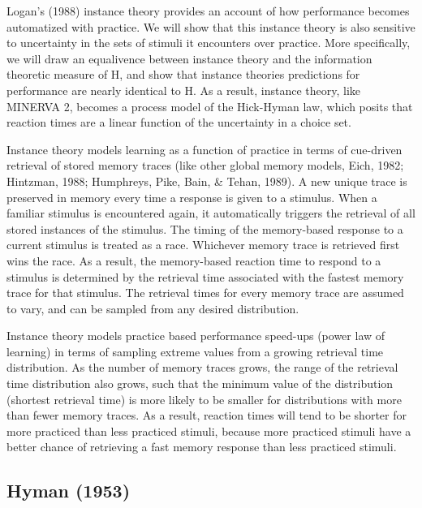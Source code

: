 \documentclass[,man,floatsintext]{apa6}
\begin{document}
Logan's (1988) instance theory provides an account of how performance becomes automatized with practice. We will show that this instance theory is also sensitive to uncertainty in the sets of stimuli it encounters over practice. More specifically, we will draw an equalivence between instance theory and the information theoretic measure of H, and show that instance theories predictions for performance are nearly identical to H. As a result, instance theory, like MINERVA 2, becomes a process model of the Hick-Hyman law, which posits that reaction times are a linear function of the uncertainty in a choice set.

Instance theory models learning as a function of practice in terms of cue-driven retrieval of stored memory traces (like other global memory models, Eich, 1982; Hintzman, 1988; Humphreys, Pike, Bain, \& Tehan, 1989). A new unique trace is preserved in memory every time a response is given to a stimulus. When a familiar stimulus is encountered again, it automatically triggers the retrieval of all stored instances of the stimulus. The timing of the memory-based response to a current stimulus is treated as a race. Whichever memory trace is retrieved first wins the race. As a result, the memory-based reaction time to respond to a stimulus is determined by the retrieval time associated with the fastest memory trace for that stimulus. The retrieval times for every memory trace are assumed to vary, and can be sampled from any desired distribution.

Instance theory models practice based performance speed-ups (power law of learning) in terms of sampling extreme values from a growing retrieval time distribution. As the number of memory traces grows, the range of the retrieval time distribution also grows, such that the minimum value of the distribution (shortest retrieval time) is more likely to be smaller for distributions with more than fewer memory traces. As a result, reaction times will tend to be shorter for more practiced than less practiced stimuli, because more practiced stimuli have a better chance of retrieving a fast memory response than less practiced stimuli.

\hypertarget{hyman-1953}{%
\subsection{Hyman (1953)}\label{hyman-1953}}
\end{document}
